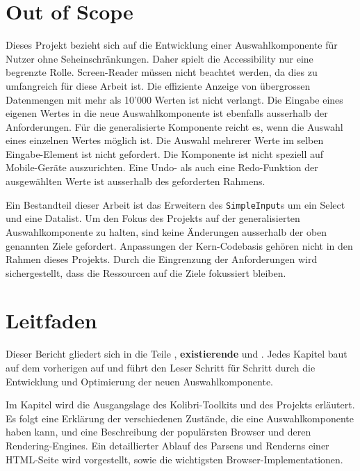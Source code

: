 \section{Out of Scope}
\label{sec:outOfScope}

Dieses Projekt bezieht sich auf die Entwicklung einer Auswahlkomponente für Nutzer ohne Seheinschränkungen.
Daher spielt die Accessibility nur eine begrenzte Rolle.
Screen-Reader müssen nicht beachtet werden, da dies zu umfangreich für diese Arbeit ist.
Die effiziente Anzeige von übergrossen Datenmengen mit mehr als 10'000 Werten ist nicht verlangt.
Die Eingabe eines eigenen Wertes in die neue Auswahlkomponente ist ebenfalls ausserhalb der Anforderungen.
Für die generalisierte Komponente reicht es, wenn die Auswahl eines einzelnen Wertes möglich ist.
Die Auswahl mehrerer Werte im selben Eingabe-Element ist nicht gefordert.
Die Komponente ist nicht speziell auf Mobile-Geräte auszurichten. 
Eine Undo- als auch eine Redo-Funktion der ausgewählten Werte ist ausserhalb des geforderten Rahmens. 

Ein Bestandteil dieser Arbeit ist das Erweitern des \texttt{SimpleInput}s um ein Select und eine Datalist.
Um den Fokus des Projekts auf der generalisierten Auswahlkomponente zu halten, sind keine Änderungen ausserhalb der oben genannten Ziele gefordert.
Anpassungen der Kern-Codebasis gehören nicht in den Rahmen dieses Projekts.
Durch die Eingrenzung der Anforderungen wird sichergestellt, dass die Ressourcen auf die Ziele fokussiert bleiben.


\section{Leitfaden}
\label{sec:tocTexted}

Dieser Bericht gliedert sich in die Teile \textbf{}, \textbf{existierende} und \textbf{}.
Jedes Kapitel baut auf dem vorherigen auf und führt den Leser Schritt für Schritt durch die Entwicklung und Optimierung der neuen Auswahlkomponente.

Im Kapitel \textbf{} wird die Ausgangslage des Kolibri-Toolkits und des Projekts erläutert.
Es folgt eine Erklärung der verschiedenen Zustände, die eine Auswahlkomponente haben kann, und eine Beschreibung der populärsten Browser und deren Rendering-Engines.
Ein detaillierter Ablauf des Parsens und Renderns einer HTML-Seite wird vorgestellt, sowie die wichtigsten Browser-Implementationen.


